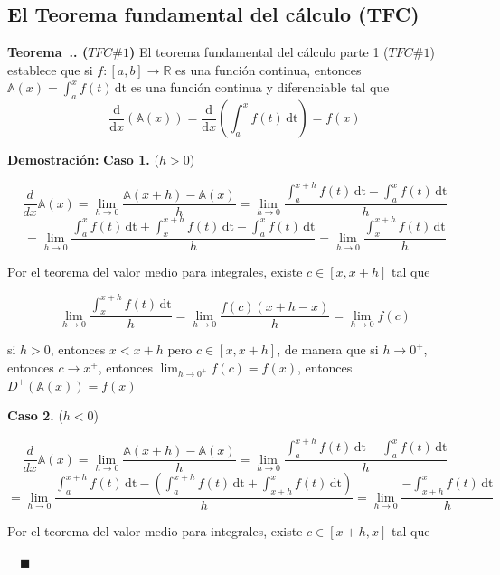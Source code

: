 \documentclass{article}
\numberwithin{equation}{section}
\newcommand{\Col}{\color{ProcessBlue}}
\newcommand{\col}[1]{\textcolor{ProcessBlue}{#1}}
\newcommand{\derivate}[2]{\frac{\mathrm{d}}{\mathrm{d}#1} \left(  {#2}  \right)  }
\newcounter{theorem}[section]
\newenvironment
{theorem}[1][]
{\vspace{0.5cm}\refstepcounter{theorem}\par\medskip\noindent\textbf{\Col Teorema~\thesection.\thetheorem. #1}\rmfamily}
{}
\newenvironment
{proof}
{\par\medskip\noindent\textbf{Demostración:}\rmfamily}
{\Col\hfill$\quad \blacksquare$\vspace{0.5cm}}
\begin{document}
\subsection{\col{El Teorema fundamental del cálculo (TFC)}}

\begin{theorem}[($TFC \#1$)]
    El teorema fundamental del cálculo parte 1 ($TFC \#1$) establece que si $f:[a,b]\longrightarrow\mathbb{R}$ es una función continua, entonces $\mathbb{A}(x)=\int_{a}^{x} \! {f(t)} \, \mathrm{dt}$ es una función continua y diferenciable tal que
    $$ \derivate{x}{\mathbb{A}(x)}=\derivate{x}{\int_{a}^{x} \! {f(t)} \, \mathrm{dt}}=f(x) $$
\end{theorem}

\begin{proof}
    \textbf{Caso 1.} ($h>0$)

    $$ \frac{d}{dx}\mathbb{A}(x)=\lim_{h\to 0}\frac{\mathbb{A}(x+h)-\mathbb{A}(x)}{h}= \lim_{h\to 0}\frac{  \int_{a}^{x+h} \! {f(t)} \, \mathrm{dt} - \int_{a}^{x} \! {f(t)} \, \mathrm{dt} }{h}$$
    $$= \lim_{h\to 0}\frac{  \int_{a}^{x} \! {f(t)} \, \mathrm{dt} + \int_{x}^{x+h} \! {f(t)} \, \mathrm{dt} - \int_{a}^{x} \! {f(t)} \, \mathrm{dt} }{h}=\lim_{h\to 0} \frac{\int_{x}^{x+h} \! {f(t)} \, \mathrm{dt}}{h} $$

    Por el teorema del valor medio para integrales, existe $c\in [x,x+h]$ tal que 

    $$\lim_{h\to 0} \frac{\int_{x}^{x+h} \! {f(t)} \, \mathrm{dt}}{h}=\lim_{h\to 0}\frac{f(c)(x+h-x)}{h}=\lim_{h\to 0}f(c)$$

    si $h>0$, entonces $x<x+h$ pero $c\in [x,x+h]$, de manera que si $h\longrightarrow 0^+$, entonces $c\longrightarrow x^+$, entonces $\lim_{h\to 0^+}f(c)=f(x)$, entonces $D^+(\mathbb{A}(x))=f(x)$

    \vspace{1cm}

    \textbf{Caso 2.} ($h<0$)

    $$ \frac{d}{dx}\mathbb{A}(x)=\lim_{h\to 0}\frac{\mathbb{A}(x+h)-\mathbb{A}(x)}{h}= \lim_{h\to 0}\frac{  \int_{a}^{x+h} \! {f(t)} \, \mathrm{dt} - \int_{a}^{x} \! {f(t)} \, \mathrm{dt} }{h}$$
    $$= \lim_{h\to 0}\frac{  \int_{a}^{x+h} \! {f(t)} \, \mathrm{dt} -\left( \int_{a}^{x+h} \! {f(t)} \, \mathrm{dt} + \int_{x+h}^{x} \! {f(t)} \, \mathrm{dt} \right)}{h}=\lim_{h\to 0} \frac{-\int_{x+h}^{x} \! {f(t)} \, \mathrm{dt}}{h} $$

    Por el teorema del valor medio para integrales, existe $c\in [x+h,x]$ tal que 


\end{proof}
\end{document}
